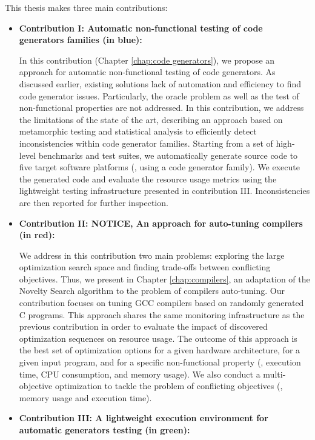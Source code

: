 This thesis makes three main contributions:
\begin{itemize}
	\item \textbf{Contribution I: Automatic non-functional testing of code generators families (in blue): }
	
	In this contribution (Chapter \ref{chap:code generators}), we propose an approach for automatic non-functional  testing of code generators. As discussed earlier, existing solutions lack of automation and efficiency to find code generator issues. Particularly, the oracle problem as well as the test of non-functional properties are not addressed. In this contribution, we address the limitations of the state of the art, describing an approach based on metamorphic testing and statistical analysis to efficiently detect inconsistencies within code generator families.
	Starting from a set of high-level benchmarks and test suites, we automatically generate source code to five target software platforms (\ie, using a code generator family). We execute the generated code and evaluate the resource usage metrics using the lightweight testing infrastructure presented in contribution III. Inconsistencies are then reported for further inspection.  
	
	\item \textbf{Contribution II: NOTICE, An approach for auto-tuning compilers (in red):}
	
	We address in this contribution two main problems: exploring the large optimization search space and finding trade-offs between conflicting objectives. 
	Thus, we present in Chapter \ref{chap:compilers}, an adaptation of the Novelty Search algorithm to the problem of compilers auto-tuning. Our contribution focuses on tuning GCC compilers based on randomly generated C programs.
	This approach shares the same monitoring infrastructure as the previous contribution in order to evaluate the impact of discovered optimization sequences on resource usage. The outcome of this approach is the best set of optimization options for a given hardware architecture, for a given input program, and for a specific non-functional property (\ie, execution time, CPU consumption, and memory usage). We also conduct a multi-objective optimization to tackle the problem of conflicting objectives (\eg, memory usage and execution time).
	
	\item \textbf{Contribution III: A lightweight execution environment for automatic generators testing (in green):}
	

\end{itemize}
